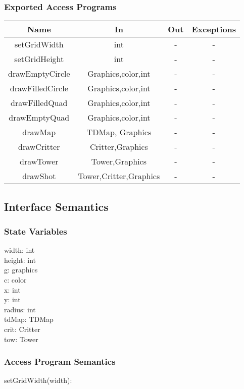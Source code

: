 \documentclass[12,english]{article}
\begin{document}
		\subsubsection{Exported Access Programs}
		\begin{table}[!htbp]
		\begin{tabular}{|c|c|c|c|}
			\hline
			Name & In & Out & Exceptions \\ \hline
			setGridWidth & int & - & - \\ \hline
			setGridHeight & int & - & - \\ \hline
			drawEmptyCircle & Graphics,color,int &  - & - \\ \hline
			drawFilledCircle & Graphics,color,int &  - & - \\ \hline
			drawFilledQuad & Graphics,color,int &  - & - \\ \hline
			drawEmptyQuad & Graphics,color,int &  -& - \\ \hline
			drawMap & TDMap, Graphics &  - & - \\ \hline
			drawCritter & Critter,Graphics &  - & - \\ \hline
			drawTower & Tower,Graphics &  - & - \\ \hline
			drawShot & Tower,Critter,Graphics &  - & - \\ \hline
		\end{tabular}
	\end{table}
		
	\subsection{Interface Semantics}
		\subsubsection{State Variables}
		width: int\\
		height: int\\
		g: graphics\\
		c: color\\
		x: int\\
		y: int\\
		radius: int\\
		tdMap: TDMap\\
		crit: Critter\\
		tow: Tower\\
		
		
	

		\subsubsection{Access Program Semantics}
        setGridWidth(width):
\end{document}
